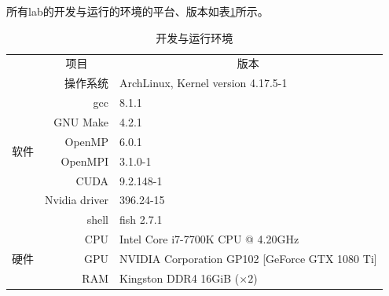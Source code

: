 \documentclass{report}
\begin{document}
\par 所有lab的开发与运行的环境的平台、版本如表\ref{tab:env}所示。
\begin{table}[htpb]
    \centering
    \caption{开发与运行环境}
    \label{tab:env}
    \begin{tabular}{ c r l }
        \toprule
        \multicolumn{1}{c}{} &
        \multicolumn{1}{c}{项目} &
        \multicolumn{1}{c}{版本} \\
        \cmidrule(lr){1-1} \cmidrule(lr){2-2} \cmidrule(lr){3-3}
        \multirow{8}{*}{软件} & 操作系统    & ArchLinux,  Kernel version 4.17.5-1\\
                              & gcc             & 8.1.1     \\
                              & GNU Make        & 4.2.1     \\
                              & OpenMP          & 6.0.1     \\
                              & OpenMPI         & 3.1.0-1   \\
                              & CUDA            & 9.2.148-1 \\
                              & Nvidia driver   & 396.24-15 \\
                              & shell           & fish 2.7.1\\
        \cmidrule(lr){1-1} \cmidrule(lr){2-2} \cmidrule(lr){3-3}
        \multirow{3}{*}{硬件} & CPU             & Intel Core i7-7700K CPU @ 4.20GHz \\
                              & GPU             & NVIDIA Corporation GP102 [GeForce GTX 1080 Ti] \\
                              & RAM             & Kingston DDR4 16GiB (\(\times 2\))\\
        \bottomrule
    \end{tabular}
\end{table}
\end{document}
